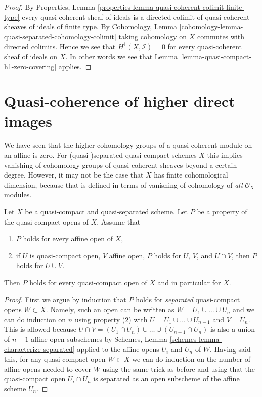 \begin{proof}
By
Properties, Lemma \ref{properties-lemma-quasi-coherent-colimit-finite-type}
every quasi-coherent sheaf of ideals is a directed colimit of
quasi-coherent sheaves of ideals of finite type.
By Cohomology, Lemma \ref{cohomology-lemma-quasi-separated-cohomology-colimit}
taking cohomology on $X$ commutes with directed colimits.
Hence we see that $H^1(X, \mathcal{I}) = 0$
for every quasi-coherent sheaf of ideals on $X$. In other words
we see that Lemma \ref{lemma-quasi-compact-h1-zero-covering} applies.
\end{proof}














\section{Quasi-coherence of higher direct images}
\label{section-quasi-coherence}

\noindent
We have seen that the higher cohomology groups of a quasi-coherent module on
an affine is zero. For (quasi-)separated quasi-compact schemes $X$ this implies
vanishing of cohomology groups of quasi-coherent sheaves beyond a certain
degree. However, it may not be the case that $X$ has finite cohomological
dimension, because that is defined in terms of vanishing of cohomology
of {\it all} $\mathcal{O}_X$-modules.

\begin{lemma}
\label{lemma-induction-principle}
Let $X$ be a quasi-compact and quasi-separated scheme. Let $P$ be a property
of the quasi-compact opens of $X$. Assume that
\begin{enumerate}
\item $P$ holds for every affine open of $X$,
\item if $U$ is quasi-compact open, $V$ affine open,
$P$ holds for $U$, $V$, and $U \cap V$, then
$P$ holds for $U \cup V$.
\end{enumerate}
Then $P$ holds for every quasi-compact open of $X$
and in particular for $X$.
\end{lemma}

\begin{proof}
First we argue by induction that $P$ holds for {\it separated} quasi-compact
opens $W \subset X$. Namely, such an open can be written as
$W = U_1 \cup \ldots \cup U_n$ and we can do induction on $n$ using
property (2) with $U = U_1 \cup \ldots \cup U_{n - 1}$ and $V = U_n$.
This is allowed because
$U \cap V = (U_1 \cap U_n) \cup \ldots \cup (U_{n - 1} \cap U_n)$
is also a union of $n - 1$ affine open subschemes by
Schemes, Lemma \ref{schemes-lemma-characterize-separated}
applied to the affine opens $U_i$ and $U_n$ of $W$.
Having said this, for any quasi-compact open $W \subset X$ we can
do induction on the number of affine opens needed to cover $W$
using the same trick as before and using that the quasi-compact open
$U_i \cap U_n$ is separated as an open subscheme of the affine scheme $U_n$.
\end{proof}

